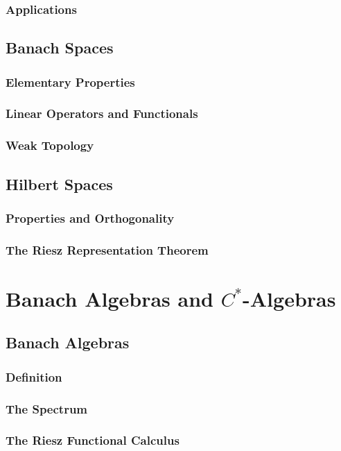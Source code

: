 \documentclass[a4paper, 11pt]{report}
\begin{document}
	\subsection{Applications}

	\section{Banach Spaces}
	\subsection{Elementary Properties}
	\subsection{Linear Operators and Functionals}
	\subsection{Weak Topology}

	\section{Hilbert Spaces}
	\subsection{Properties and Orthogonality}
	\subsection{The Riesz Representation Theorem}


	\chapter{Banach Algebras and $C^*$-Algebras}

	\section{Banach Algebras}
	\subsection{Definition}
	\subsection{The Spectrum}
	\subsection{The Riesz Functional Calculus}
\end{document}
